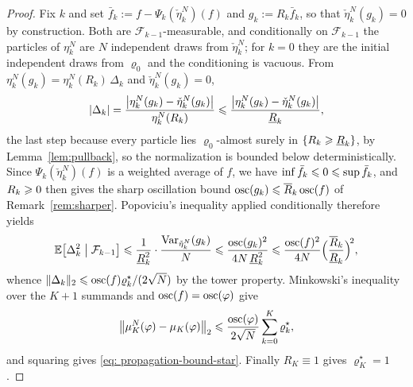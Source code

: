 \documentclass{article}
\begin{document}
{\begin{proof}
Fix $k$ and set $\bar f_k:=f-\Psi_k(\check\eta_k^N)(f)$ and $g_k:=R_k\bar f_k$, so that $\check\eta_k^N(g_k)=0$ by construction. Both are $\mathcal F_{k-1}$-measurable, and conditionally on $\mathcal F_{k-1}$ the particles of $\eta_k^N$ are $N$ independent draws from $\check\eta_k^N$; for $k=0$ they are the initial independent draws from $\varrho_0$ and the conditioning is vacuous. From $\eta_k^N(g_k)=\eta_k^N(R_k)\,\Delta_k$ and $\check\eta_k^N(g_k)=0$,
\begin{equation*}
    |\Delta_k|=\frac{\bigl|\eta_k^N(g_k)-\check\eta_k^N(g_k)\bigr|}{\eta_k^N(R_k)}
    \leqslant\frac{\bigl|\eta_k^N(g_k)-\check\eta_k^N(g_k)\bigr|}{\underline R_k},
\end{equation*}
the last step because every particle lies $\varrho_0$-almost surely in $\{R_k\geqslant\underline R_k\}$, by Lemma~\ref{lem:pullback}, so the normalization is bounded below deterministically. Since $\Psi_k(\check\eta_k^N)(f)$ is a weighted average of $f$, we have $\inf\bar f_k\leqslant0\leqslant\sup\bar f_k$, and $R_k\geqslant0$ then gives the sharp oscillation bound $\operatorname{osc}(g_k)\leqslant\overline R_k\operatorname{osc}(f)$ of Remark~\ref{rem:sharper}. Popoviciu's inequality applied conditionally therefore yields
\begin{equation*}
    \mathbb E\bigl[\Delta_k^2\bigm|\mathcal F_{k-1}\bigr]
    \leqslant\frac{1}{\underline R_k^{2}}\cdot\frac{\operatorname{Var}_{\check\eta_k^N}(g_k)}{N}
    \leqslant\frac{\operatorname{osc}(g_k)^2}{4N\,\underline R_k^{2}}
    \leqslant\frac{\operatorname{osc}(f)^2}{4N}\Bigl(\frac{\overline R_k}{\underline R_k}\Bigr)^{\!2},
\end{equation*}
whence $\lVert\Delta_k\rVert_2\leqslant\operatorname{osc}(f)\varrho^\star_k/(2\sqrt N)$ by the tower property. Minkowski's inequality over the $K+1$ summands and $\operatorname{osc}(f)=\operatorname{osc}(\varphi)$ give
\begin{equation*}
    \bigl\lVert\mu_K^N(\varphi)-\mu_K(\varphi)\bigr\rVert_2
    \leqslant\frac{\operatorname{osc}(\varphi)}{2\sqrt N}\sum_{k=0}^{K}\varrho^\star_k ,
\end{equation*}
and squaring gives \eqref{eq: propagation-bound-star}. Finally $R_K\equiv1$ gives $\varrho^\star_K=1$.
\end{proof}

}
\end{document}
